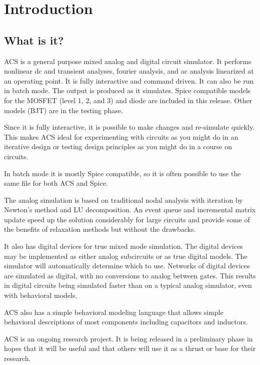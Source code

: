 \chapter{Introduction}
\section{What is it?}

ACS is a general purpose mixed analog and digital circuit simulator.  It
performs nonlinear dc and transient analyses, fourier analysis, and ac
analysis linearized at an operating point.  It is fully interactive and
command driven.  It can also be run in batch mode.  The output is produced
as it simulates.  Spice compatible models for the MOSFET (level 1, 2, and 3)
and diode are included in this release.  Other models (BJT) are in the
testing phase.

Since it is fully interactive, it is possible to make changes and re-simulate
quickly.  This makes ACS ideal for experimenting with circuits as you might
do in an iterative design or testing design principles as you might do in a
course on circuits.

In batch mode it is mostly Spice compatible, so it is often possible to use
the same file for both ACS and Spice.

The analog simulation is based on traditional nodal analysis with iteration
by Newton's method and LU decomposition.  An event queue and incremental
matrix update speed up the solution considerably for large circuits and
provide some of the benefits of relaxation methods but without the drawbacks.

It also has digital devices for true mixed mode simulation.  The digital
devices may be implemented as either analog subcircuits or as true digital
models.  The simulator will automatically determine which to use.  Networks
of digital devices are simulated as digital, with no conversions to analog
between gates.  This results in digital circuits being simulated faster than
on a typical analog simulator, even with behavioral models.

ACS also has a simple behavioral modeling language that allows simple
behavioral descriptions of most components including capacitors and
inductors.

ACS is an ongoing research project.  It is being released in a preliminary
phase in hopes that it will be useful and that others will use it as a
thrust or base for their research.
